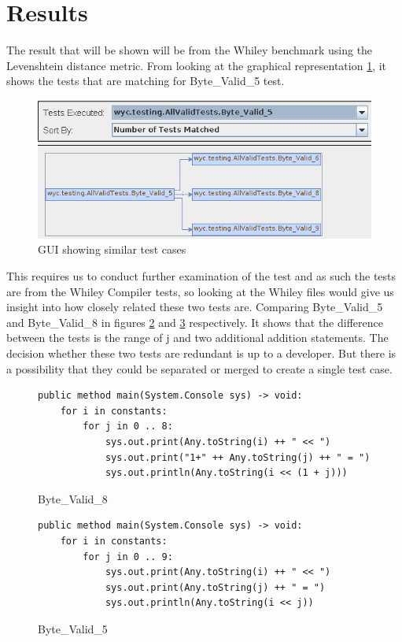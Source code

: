 \section{Results}
The result that will be shown will be from the Whiley benchmark using the Levenshtein distance metric. From looking at the graphical representation \ref{fig:similiartests}, it shows the tests that are matching for Byte\_Valid\_5 test.

\begin{figure}[h]
\caption{GUI showing similar test cases}
\label{fig:similiartests}
\includegraphics[width=\textwidth]{model24.png}
\end{figure}

This requires us to conduct further examination of the test and as such the tests are from the Whiley Compiler tests, so looking at the Whiley files would give us insight into how closely related these two tests are. Comparing Byte\_Valid\_5 and Byte\_Valid\_8 in figures \ref{fig:byte8} and \ref{fig:byte5} respectively. It shows that the difference between the tests is the range of j and two additional addition statements. The decision whether these two tests are redundant is up to a developer. But there is a possibility that they could be separated or merged to create a single test case.

\begin{figure}[h]
\caption{Byte\_Valid\_8}
\begin{lstlisting}
public method main(System.Console sys) -> void:
    for i in constants:
        for j in 0 .. 8:
            sys.out.print(Any.toString(i) ++ " << ")
            sys.out.print("1+" ++ Any.toString(j) ++ " = ")
            sys.out.println(Any.toString(i << (1 + j)))
\end{lstlisting}
\label{fig:byte8}
\end{figure}

\begin{figure}[h]
\caption{Byte\_Valid\_5}
\begin{lstlisting}
public method main(System.Console sys) -> void:
    for i in constants:
        for j in 0 .. 9:
            sys.out.print(Any.toString(i) ++ " << ")
            sys.out.print(Any.toString(j) ++ " = ")
            sys.out.println(Any.toString(i << j))
\end{lstlisting}
\label{fig:byte5}
\end{figure}



